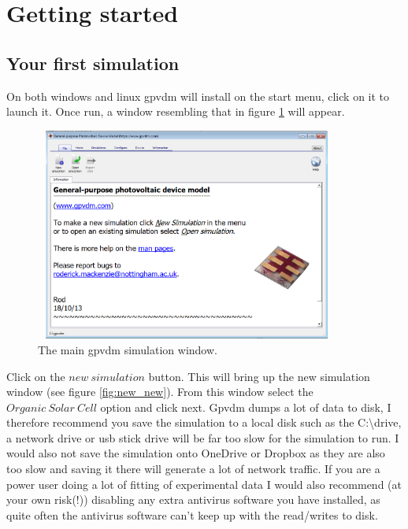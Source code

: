 \newpage
\section{Getting started}

\subsection{Your first simulation}
On both windows and linux gpvdm will install on the start menu, click on it to launch it.  Once run, a window resembling that in figure \ref{fig:new_open} will appear.  

\begin{figure}[H]
\centering
\includegraphics[width=100mm,height=70mm]{./images/new_open.png}
\caption{The main gpvdm simulation window.}
\label{fig:new_open}
\end{figure}

Click on the $new~simulation$ button.  This will bring up the new simulation window (see figure \ref{fig:new_new}).  From this window select the $Organic~Solar~Cell$ option and click next.  Gpvdm dumps a lot of data to disk, I therefore recommend you save the simulation to a local disk such as the C:\textbackslash drive, a network drive or usb stick drive will be far too slow for the simulation to run.  I would also not save the simulation onto OneDrive or Dropbox as they are also too slow and saving it there will generate a lot of network traffic.  If you are a power user doing a lot of fitting of experimental data I would also recommend (at your own risk(!)) disabling any extra antivirus software you have installed, as quite often the antivirus software can't keep up with the read/writes to disk.

